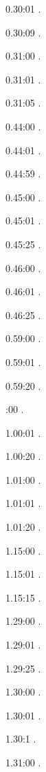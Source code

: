 \documentclass[italian]{article}
\begin{document}
0.30:01   .

0.30:09   .

0.31:00   .

0.31:01   .

0.31:05   .

0.44:00   .

0.44:01   .

0.44:59   .

0.45:00   .

0.45:01   .

0.45:25   .

0.46:00   .

0.46:01   .

0.46:25   .

0.59:00   .

0.59:01   .

0.59:20   .

:00  .

1.00:01   . 

1.00:20  .

1.01:00   . 

1.01:01  .

1.01:20   . 

1.15:00   . 

1.15:01   . 

1.15:15   . 

1.29:00   . 

1.29:01   . 

1.29:25   . 

1.30:00   .

1.30:01   .

1.30:1   .

1.31:00   .
\end{document}
